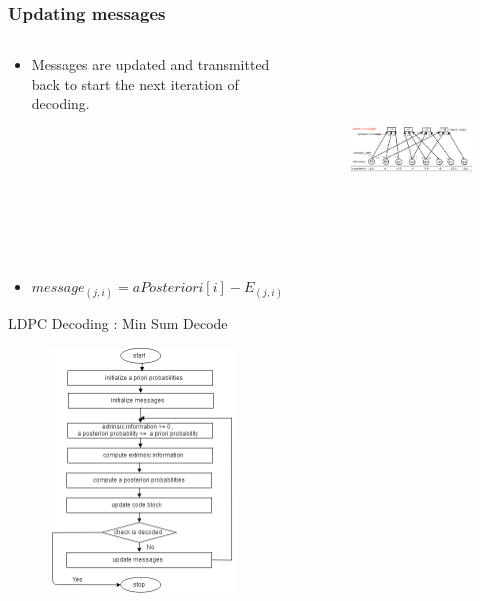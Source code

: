 \documentclass[xcolor=dvipsname]
{beamer}
\begin{document}
\begin{frame}[t]
\frametitle{ Updating messages }  
\vspace{-5mm}
\begin{columns}[totalwidth=\textwidth]
	\begin{column}{0.3\textwidth}
	\centering
	\begin{itemize}
	\item Messages are updated and transmitted back to start the next iteration of decoding.
	\end{itemize}
 
			
	\end{column}%
	   		
	\begin{column}{0.7\textwidth}
	\centering
	\begin{figure}
	\includegraphics[height=5cm,width=8cm]{minSum7}
	\end{figure}
	\end{column}%
\end{columns}

\begin{itemize}

\item \alert{$   message_{(j,i)} = aPosteriori[i] - E_{(j,i)}  $}
\end{itemize}
\end{frame}

 \begin{frame}[t]
 \alert{ LDPC Decoding : Min Sum Decode}
	\begin{figure}[h]
    \includegraphics[height=6.5cm,width=5cm]{minSumDecode_flowChart}
    \end{figure}
\end{frame}	
\end{document}
